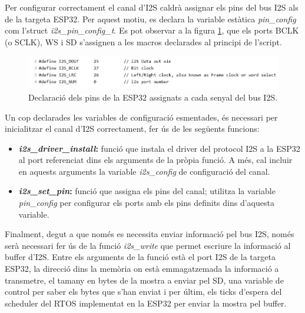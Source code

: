 \par Per configurar correctament el canal d'I2S caldrà assignar els pins del bus I2S als de la targeta ESP32. Per aquest motiu, es declara la variable estàtica \textit{pin{\_}config} com l'struct \textit{i2s{\_}pin{\_}config{\_}t}. Es pot observar a la figura \ref{pins_i2s_fig}, que els ports BCLK (o SCLK), WS i SD s'assignen a les macros declarades al principi de l'script. 
\begin{figure}[H]
    \centering
    \includegraphics[width=0.7\linewidth]{Images/pins_i2s.jpeg}
    \caption{Declaració dels pins de la ESP32 assignats a cada senyal del bus I2S.}
    \label{pins_i2s_fig}
\end{figure}

\par Un cop declarades les variables de configuració esmentades, és necessari per inicialitzar el canal d'I2S correctament, fer ús de les següents funcions:
\begin{itemize}
    \item \textbf{\textit{i2s{\_}driver{\_}install}:} funció que instala el driver del protocol I2S a la ESP32 al port referenciat dins els arguments de la pròpia funció. A més, cal incluir en aquests arguments la variable \textit{i2s{\_}config} de configuració del canal.
    \item \textbf{\textit{i2s{\_}set{\_}pin}:} funció que assigna els pins del canal; utilitza la variable \textit{pin{\_}config} per configurar els ports amb els pins definits dins d'aquesta variable. 
\end{itemize}

\par Finalment, degut a que només es necessita enviar informació pel bus I2S, només serà necessari fer ús de la funció \textit{i2s{\_}write} que permet escriure la informació al buffer d'I2S. Entre els arguments de la funció està el port I2S de la targeta ESP32, la direcció dins la memòria on està emmagatzemada la informació a transmetre, el tamany en bytes de la mostra a enviar pel SD, una variable de control per saber els bytes que s'han enviat i per últim, els ticks d'espera del scheduler del RTOS implementat en la ESP32 per enviar la mostra pel buffer.\cite{I2SESP32code}

